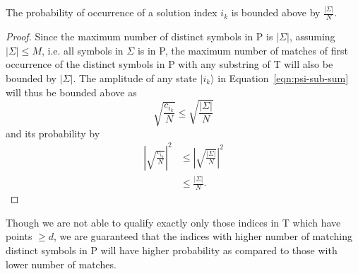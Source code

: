 \begin{claim}
The probability of occurrence of a solution index $i_k$ is bounded above by $\frac{\vert \Sigma \vert}{N}$.
\end{claim}
\begin{proof}
Since the maximum number of distinct symbols in P is $\vert \Sigma \vert$, assuming $\vert \Sigma \vert \leq M$, i.e. all symbols in $\Sigma$ is in P, the maximum number of matches of first occurrence of the distinct symbols in P with any substring of T will also be bounded by $\vert \Sigma \vert$. The amplitude of any state $\vert i_k \rangle$ in Equation~\ref{eqn:psi-sub-sum} will thus be bounded above as
\[
	\sqrt{\frac{c_{i_k}}{N}} \leq \sqrt{\frac{\vert \Sigma \vert}{N}}
\]
and its probability by
\begin{align*}
	\left\vert \sqrt{\frac{c_{i_k}}{N}} \right\vert^2 &\leq \left\vert \sqrt{\frac{\vert \Sigma \vert}{N}} \right\vert^2\\
	                                                          &\leq \frac{\vert \Sigma \vert}{N}.
\end{align*}
\end{proof}

Though we are not able to qualify exactly only those indices in T which have points $\geq d$, we are guaranteed that the indices with higher number of matching distinct symbols in P will have higher probability as compared to those with lower number of matches.

